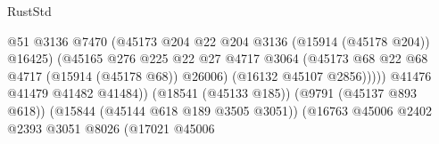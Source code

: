 \begin{lexlean}{RustStd}
\begin{coremodule}
                                                          @51
                                                          @3136
                                                          @7470
                                                          (@45173
                                                            @204
                                                            @22
                                                            @204
                                                            @3136
                                                            (@15914 (@45178 @204))
                                                            @16425)
                                                          (@45165
                                                            @276
                                                            @225
                                                            @22
                                                            @27
                                                            @4717
                                                            @3064
                                                            (@45173
                                                              @68
                                                              @22
                                                              @68
                                                              @4717
                                                              (@15914 (@45178 @68))
                                                              @26006)
                                                            (@16132 @45107 @2856)))))
                                                    @41476
                                                    @41479
                                                    @41482
                                                    @41484))
                                                (@18541 (@45133 @185))
                                                (@9791 (@45137 @893 @618))
                                                (@15844 (@45144 @618 @189 @3505 @3051))
                                                (@16763
                                                  @45006
                                                  @2402
                                                  @2393
                                                  @3051
                                                  @8026
                                                  (@17021
                                                    @45006

\end{coremodule}
\end{lexlean}
